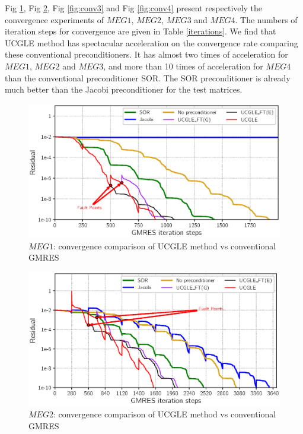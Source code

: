 Fig \ref{fig:conv1}, Fig \ref{fig:conv2}, Fig \ref{fig:conv3} and Fig \ref{fig:conv4} present respectively the convergence experiments of $MEG1$, $MEG2$, $MEG3$ and $MEG4$. The numbers of iteration steps for convergence are given in Table \ref{iterations}. We find that UCGLE method has spectacular acceleration on the convergence rate comparing these conventional preconditioners. It has almost two times of acceleration for $MEG1$, $MEG2$ and $MEG3$, and more than 10 times of acceleration for $MEG4$ than the conventional preconditioner SOR. The SOR preconditioner is already much better than the Jacobi preconditioner for the test matrices.

\begin{figure}[htbp]
	\centering
	\includegraphics[width=0.99\linewidth]{fig/convergence1.eps}
	\caption{$MEG1$: convergence comparison of UCGLE method vs conventional GMRES}
	\label{fig:conv1}
\end{figure}

\begin{figure}[htbp]
	\centering
	\includegraphics[width=0.99\linewidth]{fig/convergence2.eps}
	\caption{$MEG2$: convergence comparison of UCGLE method vs conventional GMRES}
	\label{fig:conv2}
\end{figure}

